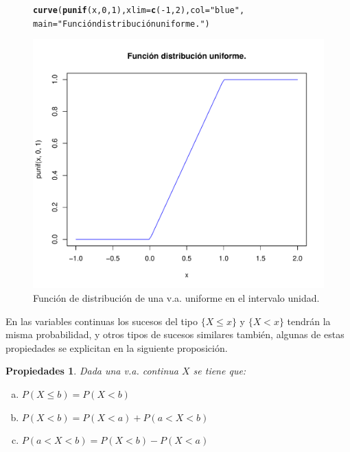 \documentclass[handout]{beamer}\usepackage[]{graphicx}\usepackage[]{color}
\makeatletter
\def\maxwidth{ %
  \ifdim\Gin@nat@width>\linewidth
    \linewidth
  \else
    \Gin@nat@width
  \fi
}
\newcommand{\hlnum}[1]{\textcolor[rgb]{0.686,0.059,0.569}{#1}}%
\newcommand{\hlstr}[1]{\textcolor[rgb]{0.192,0.494,0.8}{#1}}%
\newcommand{\hlopt}[1]{\textcolor[rgb]{0,0,0}{#1}}%
\newcommand{\hlstd}[1]{\textcolor[rgb]{0.345,0.345,0.345}{#1}}%
\newcommand{\hlkwc}[1]{\textcolor[rgb]{0.333,0.667,0.333}{#1}}%
\newcommand{\hlkwd}[1]{\textcolor[rgb]{0.737,0.353,0.396}{\textbf{#1}}}%
\newenvironment{kframe}{%
 \def\at@end@of@kframe{}%
 \ifinner\ifhmode%
  \def\at@end@of@kframe{\end{minipage}}%
  \begin{minipage}{\columnwidth}%
 \fi\fi%
 \def\FrameCommand##1{\hskip\@totalleftmargin \hskip-\fboxsep
 \colorbox{shadecolor}{##1}\hskip-\fboxsep
     \hskip-\linewidth \hskip-\@totalleftmargin \hskip\columnwidth}%
 \MakeFramed {\advance\hsize-\width
   \@totalleftmargin\z@ \linewidth\hsize
   \@setminipage}}%
 {\par\unskip\endMakeFramed%
 \at@end@of@kframe}
\newenvironment{knitrout}{}{} %
\renewcommand{\leq}{\leqslant}
\theoremstyle{plain}
\newtheorem{prop}{Propiedades}
\theoremstyle{definition}
\makeatother
\begin{document}
\begin{frame}[fragile]
\begin{figure}
\begin{center}

\begin{knitrout}
\color{fgcolor}\begin{kframe}
\begin{alltt}
\hlkwd{curve}\hlstd{(}\hlkwd{punif}\hlstd{(x,}\hlnum{0}\hlstd{,}\hlnum{1}\hlstd{),}\hlkwc{xlim}\hlstd{=}\hlkwd{c}\hlstd{(}\hlopt{-}\hlnum{1}\hlstd{,}\hlnum{2}\hlstd{),}\hlkwc{col}\hlstd{=}\hlstr{"blue"}\hlstd{,}
      \hlkwc{main}\hlstd{=}\hlstr{"Función distribución uniforme."}\hlstd{)}
\end{alltt}
\end{kframe}
\includegraphics[width=\maxwidth]{figure/unnamed-chunk-1-1} 

\end{knitrout}

\end{center}
\caption{Función de distribución de una v.a. uniforme en el intervalo unidad.}
\end{figure}


\end{frame}


\begin{frame}
En las variables continuas los sucesos del tipo $\{X\leq x \}$ y $\{X< x \}$ tendrán la
misma probabilidad, y otros tipos de sucesos similares también, algunas de estas
propiedades se explicitan en la siguiente proposición.

\begin{prop}
Dada una v.a. continua $X$ se tiene que:
\begin{enumerate}[a)]
\item $P(X\leq b)=P(X<b)$
\item $P(X<b)=P(X<a)+P(a<X<b)$
\item $P(a<X<b)=P(X<b)-P(X<a)$
\end{enumerate}
\end{prop}
\end{frame}
\end{document}
